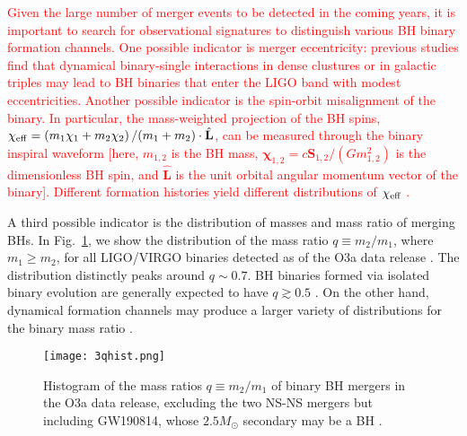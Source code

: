 \documentclass[
        fleqn,
        usenatbib,
    ]{mnras}
\newcommand*{\p}[1]{\left(#1\right)}
\newcommand*{\bm}[1]{\mathbf{#1}}
\newcommand*{\uv}[1]{\hat{\mathbf{#1}}}
\begin{document}
\textcolor{red}{Given the large number of merger events to be detected in the
coming years, it is important to search for observational signatures to
distinguish various BH binary formation channels. One possible indicator is
merger eccentricity: previous studies find that dynamical binary-single
interactions in dense clustures \citep[e.g.,][]{samsing2017assembly,
rodriguez2018post, samsing2018black, fragione2019bromberg} or in galactic
triples \citep{silsbee2017lidov, antonini2017binary, fragione2019loeb} may lead
to BH binaries that enter the LIGO band with modest eccentricities. Another
possible indicator is the spin-orbit misalignment of the binary. In particular,
the mass-weighted projection of the BH spins, $\chi_{\rm eff} = \p{m_1
\bm{\chi}_1 + m_2\bm{\chi}_2} / (m_1 + m_2) \cdot \uv{L}$, can be measured
through the binary inspiral waveform [here, $m_{1,2}$ is the BH mass,
$\bm{\chi}_{1,2} = c\bm{S}_{1,2} / \p{Gm_{1,2}^2}$ is the dimensionless BH spin,
and $\uv{L}$ is the unit orbital angular momentum vector of the binary].
Different formation histories yield different distributions of $\chi_{\rm eff}$
\citep{LL17, LL18, antonini2018precessional, rodriguez2018post, gerosa2018,
LL19, su2020spin}.}

A third possible indicator is the distribution of masses and mass ratio of
merging BHs. In Fig.~\ref{fig:qhist}, we show the distribution of the mass
ratio $q \equiv m_2 / m_1$, where $m_1 \geq m_2$, for all LIGO/VIRGO binaries
detected as of the O3a data release \citep{LIGOO3a}. The distribution distinctly
peaks around $q \sim 0.7$. BH binaries formed via isolated binary evolution are
generally expected to have $q \gtrsim 0.5$ \citep{belczynski2016first,
olejak2020}. On the other hand, dynamical formation channels may produce a
larger variety of distributions for the binary mass ratio
\citep[e.g.,][]{rodriguez2016binary, silsbee2017lidov, fragione2019}.

\begin{figure}
    \centering
    \texttt{[image: 3qhist.png]}
    \caption{Histogram of the mass ratios $q \equiv m_2 / m_1$ of binary BH
    mergers in the O3a data release, excluding the two NS-NS mergers but including
    GW190814, whose $2.5M_{\odot}$ secondary may be a BH \citep{LIGOO3a}.
    }\label{fig:qhist}
\end{figure}
\end{document}
